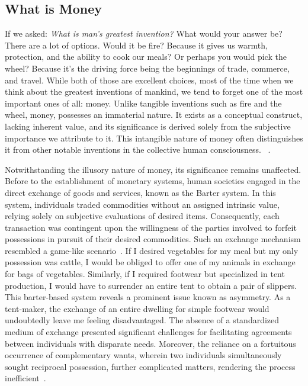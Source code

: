 \subsection{What is Money}
If we asked: \textit{What is man's greatest invention?} What would your answer be? There are a lot of options. Would it be fire?
Because it gives us warmth, protection, and the ability to cook our meals? Or perhaps you would pick the wheel? Because it's the driving force being the beginnings of trade, commerce, and travel. While both of those are excellent choices, most of the time when we think about the greatest inventions of
mankind, we tend to forget one of the most important ones of all: money. Unlike tangible inventions such as fire and the wheel, money, possesses an
immaterial nature. It exists as a conceptual construct, lacking inherent value, and its significance is derived solely from the subjective importance we
attribute to it. This intangible nature of money often distinguishes it from other notable inventions in the collective human consciousness.
~\cite{smith2010wealth}.

Notwithstanding the illusory nature of money, its significance remains unaffected. Before to the establishment of monetary systems, human
societies engaged in the direct exchange of goods and services, known as the Barter system. In this system, individuals traded commodities without
an assigned intrinsic value, relying solely on subjective evaluations of desired items. Consequently, each transaction was contingent upon
the willingness of the parties involved to forfeit possessions in pursuit of their desired commodities. Such an exchange mechanism resembled a
game-like scenario~\cite{durlauf2016new}. If I desired vegetables for my meal but my only possession was cattle,
I would be obliged to offer one of my animals in exchange for bags of vegetables. Similarly, if I required footwear but specialized in tent
production, I would have to surrender an entire tent to obtain a pair of slippers. This barter-based system reveals a prominent issue known
as asymmetry. As a tent-maker, the exchange of an entire dwelling for simple footwear would undoubtedly leave me feeling disadvantaged. The
absence of a standardized medium of exchange presented significant challenges for facilitating agreements between individuals with disparate
needs. Moreover, the reliance on a fortuitous occurrence of complementary wants, wherein two individuals simultaneously sought reciprocal
possession, further complicated matters, rendering the process inefficient~\cite{goodhart1998two}.

